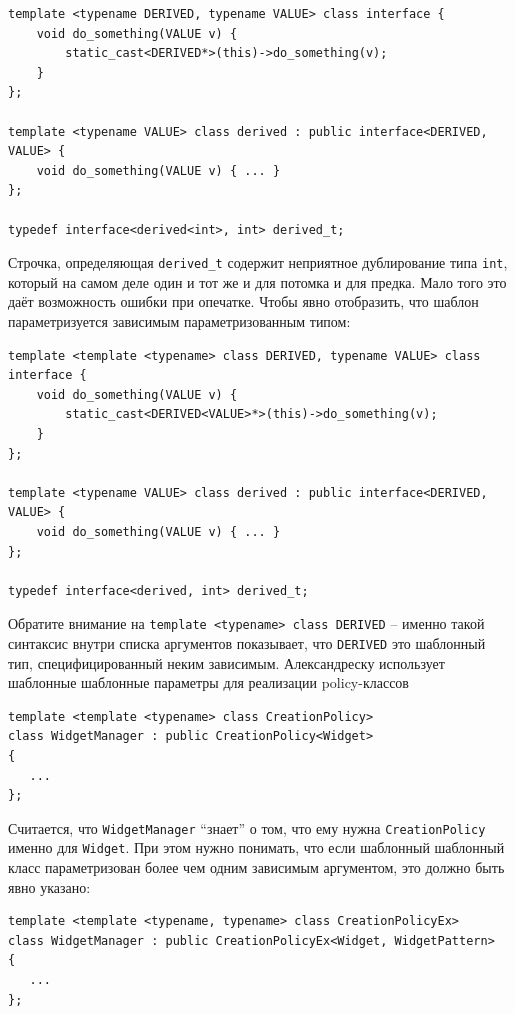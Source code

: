 \documentclass[a4paper,12pt,oneside]{article}
\begin{document}
\begin{lstlisting}
template <typename DERIVED, typename VALUE> class interface {
    void do_something(VALUE v) {
        static_cast<DERIVED*>(this)->do_something(v);
    }
};

template <typename VALUE> class derived : public interface<DERIVED, VALUE> {
    void do_something(VALUE v) { ... }
};

typedef interface<derived<int>, int> derived_t;
\end{lstlisting}

Строчка, определяющая \lstinline!derived_t! содержит неприятное дублирование типа  \lstinline!int!, который на самом деле один и тот же и для потомка и для предка. Мало того это даёт возможность ошибки при опечатке. Чтобы явно отобразить, что шаблон параметризуется зависимым параметризованным типом:

\begin{lstlisting}
template <template <typename> class DERIVED, typename VALUE> class interface {
    void do_something(VALUE v) {
        static_cast<DERIVED<VALUE>*>(this)->do_something(v);
    }
};

template <typename VALUE> class derived : public interface<DERIVED, VALUE> {
    void do_something(VALUE v) { ... }
};

typedef interface<derived, int> derived_t;
\end{lstlisting}

Обратите внимание на \lstinline!template <typename> class DERIVED! -- именно такой синтаксис внутри списка аргументов показывает, что \lstinline!DERIVED! это шаблонный тип, специфицированный неким зависимым. Александреску\cite{mcpp} использует шаблонные шаблонные параметры для реализации policy-классов

\begin{lstlisting}
template <template <typename> class CreationPolicy>
class WidgetManager : public CreationPolicy<Widget>
{
   ...
};
\end{lstlisting}

Считается, что \lstinline!WidgetManager! ``знает'' о том, что ему нужна \lstinline!CreationPolicy! именно для \lstinline!Widget!. При этом нужно понимать, что если шаблонный шаблонный класс параметризован более чем одним зависимым аргументом, это должно быть явно указано:

\begin{lstlisting}
template <template <typename, typename> class CreationPolicyEx>
class WidgetManager : public CreationPolicyEx<Widget, WidgetPattern>
{
   ...
};
\end{lstlisting}
\end{document}
